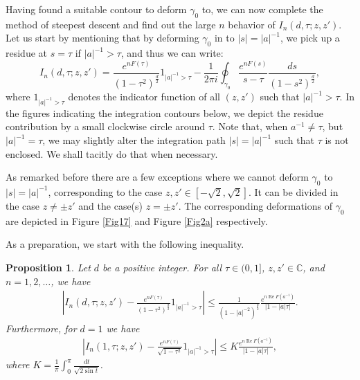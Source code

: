 \documentclass[%
 jmp,
cp,  %
 amsmath,amsthm,amssymb,%
 reprint,%
onecolumn]{revtex4-2}
\newtheorem{proposition}[theorem]{Proposition}
\begin{document}
Having found a suitable contour to deform $\gamma_0$ to, we can now complete the method of steepest descent and find out the large $n$ behavior of $I_n(d,\tau;z,z')$. Let us start by mentioning that by deforming $\gamma_0$ in to $|s|=|a|^{-1}$, we  pick up a residue at $s=\tau$ if $|a|^{-1}> \tau$, and thus we can write:
\begin{equation}
    I_n(d,\tau;z,z') = \frac{e^{n F(\tau)}}{(1-\tau^2)^\frac{d}{2}} \mathfrak{1}_{|a|^{-1}>\tau} -\frac{1}{2\pi i} \oint_{\gamma_0} \frac{e^{n F(s)}}{s-\tau} \frac{ds}{(1-s^2)^\frac{d}{2}},
\end{equation}
where $\mathfrak{1}_{|a|^{-1}>\tau}$ denotes the indicator function of all $(z,z')$ such that $|a|^{-1}>\tau$. In the figures indicating the integration contours below, we depict the residue contribution by a small clockwise circle around $\tau$. Note that, when $a^{-1}\neq \tau$, but $|a|^{-1}=\tau$, we may slightly alter the integration path $|s|=|a|^{-1}$ such that $\tau$ is not enclosed. We shall tacitly do that when necessary.

As remarked before there are a few exceptions where we cannot deform $\gamma_0$ to $|s|=|a|^{-1}$, corresponding to the case $z, z'\in [-\sqrt 2, \sqrt 2]$. It can be divided in the case $z\neq \pm z'$ and the case(s) $z=\pm z'$. The corresponding deformations of $\gamma_0$ are depicted in Figure \ref{Fig17} and Figure \ref{Fig2a} respectively. 

 As a preparation, we start with the following inequality.
\begin{proposition} \label{thm:errorTermUniform1}
Let $d$ be a positive integer. For all $\tau\in (0,1]$, $z, z'\in\mathbb C$, and $n=1,2,\ldots$, we have
\begin{align} \label{thm:errorTermUniform1d}
\left|I_n(d,\tau;z,z') - \frac{e^{n F(\tau)}}{(1-\tau^2)^\frac{d}{2}} \mathfrak{1}_{|a|^{-1}>\tau}\right|
\leq  \frac{1}{(1-|a|^{-2})^\frac{d}{2}} \frac{e^{n \operatorname{Re} F(a^{-1})}}{\left|1- |a|\tau\right|}.
\end{align} 
Furthermore, for $d=1$ we have
\begin{align} \label{thm:errorTermUniform1d=1}
\left|I_n(1,\tau;z,z') - \frac{e^{n F(\tau)}}{\sqrt{1-\tau^2}} \mathfrak{1}_{|a|^{-1}>\tau}\right|
\leq  K \frac{e^{n \operatorname{Re} F(a^{-1})}}{\left|1- |a|\tau\right|},
\end{align}
where 
$K= \displaystyle\frac{1}{\pi} \int_0^\pi \frac{dt}{\sqrt{2 \sin t}}$.
\end{proposition}
\end{document}
